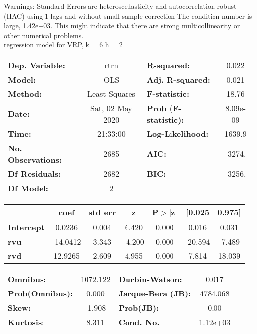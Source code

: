 Warnings: \newline
 [1] Standard Errors are heteroscedasticity and autocorrelation robust (HAC) using 1 lags and without small sample correction \newline
 [2] The condition number is large, 1.42e+03. This might indicate that there are \newline
 strong multicollinearity or other numerical problems.\\ 

regression model for VRP, k = 6 h = 2\begin{center}
\begin{tabular}{lclc}
\toprule
\textbf{Dep. Variable:}    &       rtrn       & \textbf{  R-squared:         } &     0.022   \\
\textbf{Model:}            &       OLS        & \textbf{  Adj. R-squared:    } &     0.021   \\
\textbf{Method:}           &  Least Squares   & \textbf{  F-statistic:       } &     18.76   \\
\textbf{Date:}             & Sat, 02 May 2020 & \textbf{  Prob (F-statistic):} &  8.09e-09   \\
\textbf{Time:}             &     21:33:00     & \textbf{  Log-Likelihood:    } &    1639.9   \\
\textbf{No. Observations:} &        2685      & \textbf{  AIC:               } &    -3274.   \\
\textbf{Df Residuals:}     &        2682      & \textbf{  BIC:               } &    -3256.   \\
\textbf{Df Model:}         &           2      & \textbf{                     } &             \\
\bottomrule
\end{tabular}
\begin{tabular}{lcccccc}
                   & \textbf{coef} & \textbf{std err} & \textbf{z} & \textbf{P$> |$z$|$} & \textbf{[0.025} & \textbf{0.975]}  \\
\midrule
\textbf{Intercept} &       0.0236  &        0.004     &     6.420  &         0.000        &        0.016    &        0.031     \\
\textbf{rvu}       &     -14.0412  &        3.343     &    -4.200  &         0.000        &      -20.594    &       -7.489     \\
\textbf{rvd}       &      12.9265  &        2.609     &     4.955  &         0.000        &        7.814    &       18.039     \\
\bottomrule
\end{tabular}
\begin{tabular}{lclc}
\textbf{Omnibus:}       & 1072.122 & \textbf{  Durbin-Watson:     } &    0.017  \\
\textbf{Prob(Omnibus):} &   0.000  & \textbf{  Jarque-Bera (JB):  } & 4784.068  \\
\textbf{Skew:}          &  -1.908  & \textbf{  Prob(JB):          } &     0.00  \\
\textbf{Kurtosis:}      &   8.311  & \textbf{  Cond. No.          } & 1.12e+03  \\
\bottomrule
\end{tabular}
\end{center}

